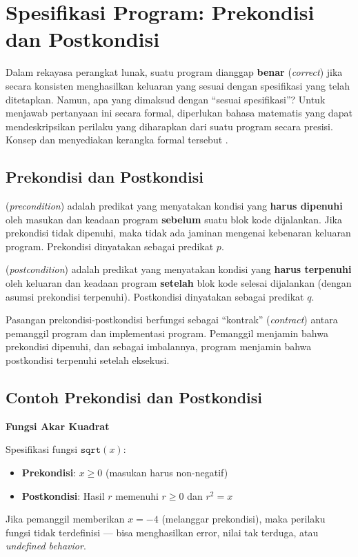 \section{Spesifikasi Program: Prekondisi dan Postkondisi}

Dalam rekayasa perangkat lunak, suatu program dianggap \textbf{benar} (\textit{correct}) jika secara konsisten menghasilkan keluaran yang sesuai dengan spesifikasi yang telah ditetapkan. Namun, apa yang dimaksud dengan ``sesuai spesifikasi''? Untuk menjawab pertanyaan ini secara formal, diperlukan bahasa matematis yang dapat mendeskripsikan perilaku yang diharapkan dari suatu program secara presisi. Konsep  dan  menyediakan kerangka formal tersebut \cite{rosen2019}.

\subsection{Prekondisi dan Postkondisi}

\begin{definisi}[Prekondisi]
 (\textit{precondition}) adalah predikat yang menyatakan kondisi yang \textbf{harus dipenuhi} oleh masukan dan keadaan program \textbf{sebelum} suatu blok kode dijalankan. Jika prekondisi tidak dipenuhi, maka tidak ada jaminan mengenai kebenaran keluaran program. Prekondisi dinyatakan sebagai predikat $p$.
\end{definisi}

\begin{definisi}[Postkondisi]
 (\textit{postcondition}) adalah predikat yang menyatakan kondisi yang \textbf{harus terpenuhi} oleh keluaran dan keadaan program \textbf{setelah} blok kode selesai dijalankan (dengan asumsi prekondisi terpenuhi). Postkondisi dinyatakan sebagai predikat $q$.
\end{definisi}

Pasangan prekondisi-postkondisi berfungsi sebagai ``kontrak'' (\textit{contract}) antara pemanggil program dan implementasi program. Pemanggil menjamin bahwa prekondisi dipenuhi, dan sebagai imbalannya, program menjamin bahwa postkondisi terpenuhi setelah eksekusi.

\subsection{Contoh Prekondisi dan Postkondisi}

\begin{contoh}
\textbf{Fungsi Akar Kuadrat}

Spesifikasi fungsi $\texttt{sqrt}(x)$:
\begin{itemize}
    \item \textbf{Prekondisi}: $x \geq 0$ (masukan harus non-negatif)
    \item \textbf{Postkondisi}: Hasil $r$ memenuhi $r \geq 0$ dan $r^2 = x$
\end{itemize}

Jika pemanggil memberikan $x = -4$ (melanggar prekondisi), maka perilaku fungsi tidak terdefinisi --- bisa menghasilkan error, nilai tak terduga, atau \textit{undefined behavior}.
\end{contoh}


